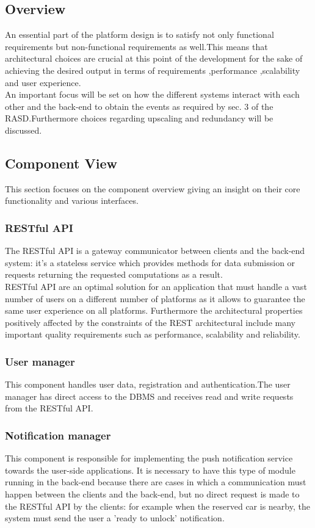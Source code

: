 \subsection{Overview}
An essential part of the platform design is to satisfy not only functional requirements but non-functional requirements as well.This means that architectural choices are crucial at this point of the development for the sake of achieving the desired output in terms of requirements ,performance ,scalability and user experience.\\
An important focus will be set on how the different systems interact with each other and the back-end to obtain the events as required by sec. 3 of the RASD.Furthermore choices regarding upscaling and redundancy will be discussed.\\

\subsection{Component View}
This section focuses on the component overview giving an insight on their core functionality and various interfaces.\\
\subsubsection{RESTful API}
The RESTful API is a gateway communicator between clients and the back-end system: it's a stateless service which provides methods for data submission or requests returning the requested computations as a result.\\
RESTful API are an optimal solution for an application that must handle a vast number of users on a different number of platforms as it allows to guarantee the same user experience on all platforms. Furthermore the architectural properties positively affected by the constraints of the REST architectural include many important quality requirements such as performance, scalability and reliability.

\subsubsection{User manager}
This component handles user data, registration and authentication.The user manager has direct access to the DBMS and receives read and write requests from the RESTful API.
\subsubsection{Notification manager}
This component is responsible for implementing the push notification service towards
the user-side applications.
It is necessary to have this type of module running in the back-end because
there are cases in which a communication must happen between the clients and
the back-end, but no direct request is made to the RESTful API by the clients:
for example when the reserved car is nearby, the system must send the user a 'ready to unlock' notification.
